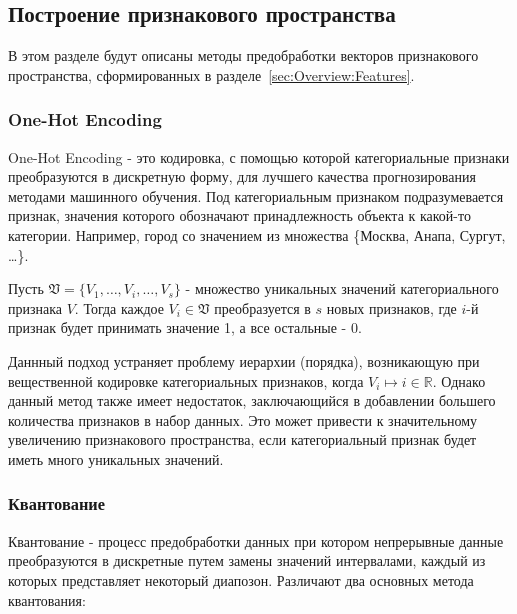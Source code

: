 \documentclass[12pt]{article}
\begin{document}
    \subsection{Построение признакового пространства}
    \label{sec:Research:FeatureSpace}

    \par В этом разделе будут описаны методы предобработки векторов признакового пространства, сформированных в разделе~\ref{sec:Overview:Features}.

    \subsubsection{One-Hot Encoding}
    \label{sec:Research:FeatureSpace:OneHotEncoding}

    \par One-Hot Encoding - это кодировка, с помощью которой категориальные признаки преобразуются в дискретную форму, для лучшего качества прогнозирования методами машинного обучения. Под категориальным признаком подразумевается признак, значения которого обозначают принадлежность объекта к какой-то категории. Например, город со значением из множества \{Москва, Анапа, Сургут, \ldots\}.

    \par Пусть $ \mathfrak{V} = \{V_1, \ldots, V_i, \ldots, V_s\} $ - множество уникальных значений категориального признака $V$. Тогда каждое $V_i \in \mathfrak{V}$ преобразуется в $s$ новых признаков, где $i$-й признак будет принимать значение 1, а все остальные - 0.

    \par Даннный подход устраняет проблему иерархии (порядка), возникающую при вещественной кодировке категориальных признаков, когда $V_i \mapsto i \in \mathbb{R}$. Однако данный метод также имеет недостаток, заключающийся в добавлении большего количества признаков в набор данных. Это может привести к значительному увеличению признакового пространства, если категориальный признак будет иметь много уникальных значений.
    

    \subsubsection{Квантование}
    \label{sec:Research:FeatureSpace:Quantile}

    \par Квантование \cite{BINNING} - процесс предобработки данных при котором непрерывные данные преобразуются в дискретные путем замены значений интервалами, каждый из которых представляет некоторый диапозон. Различают два основных метода квантования:
\end{document}
